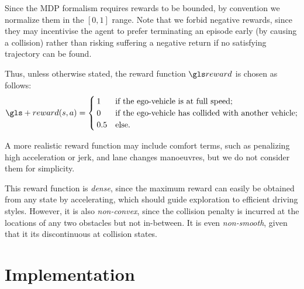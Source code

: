 Since the \gls{MDP} formalism requires rewards to be bounded, by convention we normalize them in the $[0, 1]$ range.
Note that we forbid negative rewards, since they may incentivise the agent to prefer terminating an episode early (by causing a collision) rather than risking suffering a negative return if no satisfying trajectory can be found.

Thus, unless otherwise stated, the reward function $\R$ is chosen as follows:
\begin{equation}
\label{eq:reward-function}
\gls+{reward}(s,a) = 
\begin{cases}
1 & \text{if the ego-vehicle is at full speed;}\\
0 & \text{if the ego-vehicle has collided with another vehicle;}\\
0.5 & \text{else.}
\end{cases}
\end{equation}

A more realistic reward function may include comfort terms, such as penalizing high acceleration or jerk, and lane changes manoeuvres, but we do not consider them for simplicity.

This reward function is \emph{dense}, since the maximum reward can easily be obtained from any state by accelerating, which should guide exploration to efficient driving styles. However, it is also \emph{non-convex}, since \eg the collision penalty is incurred at the locations of any two obstacles but not in-between. It is even \emph{non-smooth}, given that it its discontinuous at collision states.

\section{Implementation}

